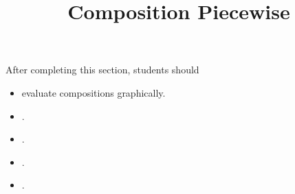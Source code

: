 \documentclass{ximera}
\title{Composition Piecewise}
\begin{document}
\begin{abstract}
\end{abstract}
\maketitle

\begin{sectionOutcomes}
After completing this section, students should 

\begin{itemize}
\item evaluate compositions graphically.
\item .
\item .
\item .
\item .
\end{itemize}
\end{sectionOutcomes}
\end{document}
